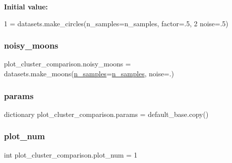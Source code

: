 {\bfseries Initial value\+:}
\begin{DoxyCode}
1 =  datasets.make\_circles(n\_samples=n\_samples, factor=.5,
2                                       noise=.5)
\end{DoxyCode}
\mbox{\label{namespaceplot__cluster__comparison_a90ab3d67916d16226f58ffe7c50d7623}} 
\subsubsection{\texorpdfstring{noisy\+\_\+moons}{noisy\_moons}}
{\footnotesize\ttfamily plot\+\_\+cluster\+\_\+comparison.\+noisy\+\_\+moons = datasets.\+make\+\_\+moons(\hyperlink{namespaceplot__cluster__comparison_a2e68edd1586a01f4249bfe2cf368074b}{n\+\_\+samples}=\hyperlink{namespaceplot__cluster__comparison_a2e68edd1586a01f4249bfe2cf368074b}{n\+\_\+samples}, noise=.)}

\mbox{\label{namespaceplot__cluster__comparison_a5afe27ff875351ace28865d50f61c56a}} 
\subsubsection{\texorpdfstring{params}{params}}
{\footnotesize\ttfamily dictionary plot\+\_\+cluster\+\_\+comparison.\+params = default\+\_\+base.\+copy()}

\mbox{\label{namespaceplot__cluster__comparison_a4dd5866fcfb5665cc1aa3406261b692e}} 
\subsubsection{\texorpdfstring{plot\+\_\+num}{plot\_num}}
{\footnotesize\ttfamily int plot\+\_\+cluster\+\_\+comparison.\+plot\+\_\+num = 1}

